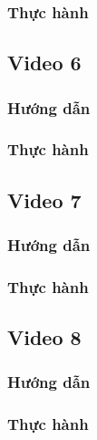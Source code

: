 \documentclass{article}
\begin{document}
\subsubsection{Thực hành}




\newpage
\subsection{Video 6}
\subsubsection{Hướng dẫn}

\subsubsection{Thực hành}




\newpage
\subsection{Video 7}
\subsubsection{Hướng dẫn}

\subsubsection{Thực hành}




\newpage
\subsection{Video 8}
\subsubsection{Hướng dẫn}

\subsubsection{Thực hành}








\end{document}
